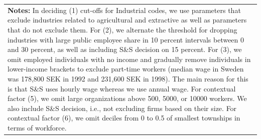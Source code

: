\documentclass{article}
\begin{document}
\begin{table}[htbp]
{\begin{tabular}{lp{4cm}p{4cm}p{4cm}}
\multicolumn{4}{p{18cm}}{\textbf{Notes:} In deciding (1) cut-offs for Industrial codes, we use parameters that exclude industries related to agricultural and extractive as well as parameters that do not exclude them. For (2), we alternate the threshold for dropping industries with large public employee share in 10 percent intervals between 0 and 30 percent, as well as including S\&S decision on 15 percent. For (3), we omit employed individuals with no income and gradually remove individuals in lower-income brackets to exclude part-time workers (median wage in Sweden was 178,800 SEK in 1992 and 231,600 SEK in 1998). The main reason for this is that S\&S uses hourly wage whereas we use annual wage. For contextual factor (5), we omit large organizations above 500, 5000, or 10000 workers. We also include S\&S decision, i.e., not excluding firms based on their size. For contextual factor (6), we omit deciles from 0 to 0.5 of smallest townships in terms of workforce.} \\
\end{tabular}%
}
\label{tab:mytable}
\end{table}
\end{document}
